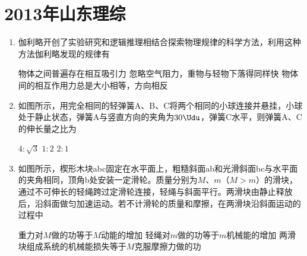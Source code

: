\documentclass[\gkver]{gaokaozhenti}
\begin{document}
\chapter{2013年山东理综}

\begin{enumerate}
\item
伽利略开创了实验研究和逻辑推理相结合探索物理规律的科学方法，利用这种方法伽利略发现的规律有

{物体之间普遍存在相互吸引力}
{忽略空气阻力，重物与轻物下落得同样快}
{物体间的相互作用力总是大小相等，方向相反}


\item
如图所示，用完全相同的轻弹簧A、B、C将两个相同的小球连接并悬挂，小球处于静止状态，弹簧A与竖直方向的夹角为$30\Udu$，弹簧C水平，则弹簧A、C的伸长量之比为


{$4:\sqrt 3$}
{$1:2$}
{$2:1$}


\item
如图所示，楔形木块abc固定在水平面上，粗糙斜面ab和光滑斜面bc与水平面的夹角相同，顶角b处安装一定滑轮。质量分别为$M$、$m$（$M>m$）的滑块，通过不可伸长的轻绳跨过定滑轮连接，轻绳与斜面平行。两滑块由静止释放后，沿斜面做匀加速运动。若不计滑轮的质量和摩擦，在两滑块沿斜面运动的过程中


{重力对$M$做的功等于$M$动能的增加}
{轻绳对$m$做的功等于$m$机械能的增加}
{两滑块组成系统的机械能损失等于$M$克服摩擦力做的功}


\end{enumerate}
\end{document}
